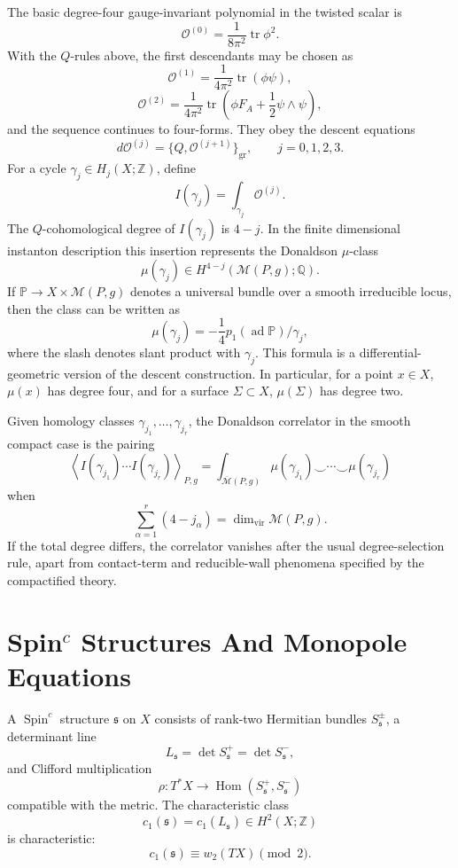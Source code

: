 The basic degree-four gauge-invariant polynomial in the twisted scalar is
\[
  \mathcal O^{(0)}
  =
  \frac{1}{8\pi^2}\operatorname{tr}\phi^2 .
\]
With the \(Q\)-rules above, the first descendants may be chosen as
\[
  \mathcal O^{(1)}
  =
  \frac{1}{4\pi^2}\operatorname{tr}(\phi\psi),
\]
\[
  \mathcal O^{(2)}
  =
  \frac{1}{4\pi^2}\operatorname{tr}
  \left(\phi F_A+\frac{1}{2}\psi\wedge\psi\right),
\]
and the sequence continues to four-forms.  They obey the descent equations
\[
  d\mathcal O^{(j)}
  =
  \{Q,\mathcal O^{(j+1)}\}_{\mathrm{gr}},
  \qquad j=0,1,2,3 .
\]
For a cycle \(\gamma_j\in H_j(X;\mathbb Z)\), define
\[
  I(\gamma_j)=\int_{\gamma_j}\mathcal O^{(j)} .
\]
The \(Q\)-cohomological degree of \(I(\gamma_j)\) is \(4-j\).  In the finite
dimensional instanton description this insertion represents the Donaldson
\(\mu\)-class
\[
  \mu(\gamma_j)\in
  H^{4-j}(\mathcal M(P,g);\mathbb Q).
\]
If \(\mathbb P\to X\times\mathcal M(P,g)\) denotes a universal bundle over a
smooth irreducible locus, then the class can be written as
\[
  \mu(\gamma_j)
  =
  -\frac{1}{4}
  p_1(\operatorname{ad}\mathbb P)/\gamma_j ,
\]
where the slash denotes slant product with \(\gamma_j\).  This formula is a
differential-geometric version of the descent construction.  In particular,
for a point \(x\in X\), \(\mu(x)\) has degree four, and for a surface
\(\Sigma\subset X\), \(\mu(\Sigma)\) has degree two.

Given homology classes \(\gamma_{j_1},\ldots,\gamma_{j_r}\), the Donaldson
correlator in the smooth compact case is the pairing
\[
  \left\langle
    I(\gamma_{j_1})\cdots I(\gamma_{j_r})
  \right\rangle_{P,g}
  =
  \int_{\overline{\mathcal M}(P,g)}
  \mu(\gamma_{j_1})\smile\cdots\smile\mu(\gamma_{j_r})
\]
when
\[
  \sum_{\alpha=1}^r(4-j_\alpha)
  =
  \dim_{\mathrm{vir}}\mathcal M(P,g).
\]
If the total degree differs, the correlator vanishes after the usual
degree-selection rule, apart from contact-term and reducible-wall phenomena
specified by the compactified theory.

\section{Spin\texorpdfstring{\(^c\)}{c} Structures And Monopole Equations}

A \(\operatorname{Spin}^c\) structure \(\mathfrak s\) on \(X\) consists of
rank-two Hermitian bundles \(S^\pm_{\mathfrak s}\), a determinant line
\[
  L_{\mathfrak s}=\det S^+_{\mathfrak s}=\det S^-_{\mathfrak s},
\]
and Clifford multiplication
\[
  \rho:T^*X\longrightarrow
  \operatorname{Hom}(S^+_{\mathfrak s},S^-_{\mathfrak s})
\]
compatible with the metric.  The characteristic class
\[
  c_1(\mathfrak s)=c_1(L_{\mathfrak s})\in H^2(X;\mathbb Z)
\]
is characteristic:
\[
  c_1(\mathfrak s)\equiv w_2(TX)\pmod2 .
\]

